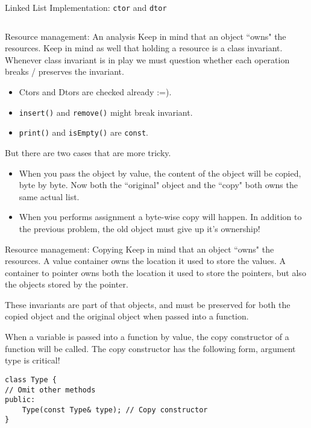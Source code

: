 \begin{frame}[fragile]{Linked List Implementation: \texttt{ctor} and \texttt{dtor}}
\inputminted[firstline=4,lastline=15]{c++}{code/Linked-List/IntList.cpp}
\end{frame}

\begin{frame}[fragile]{Resource management: An analysis}
Keep in mind that an object ``owns" the resources. Keep in mind as well that holding a resource is a class invariant. Whenever class invariant is in play we must question whether each operation breaks / preserves the invariant. 

\begin{itemize}
	\item Ctors and Dtors are checked already :=).
	\item \texttt{insert()} and \texttt{remove()} might break invariant.
	\item \texttt{print()} and \texttt{isEmpty()} are \texttt{const}.
\end{itemize}

But there are two cases that are more tricky.
\begin{itemize}
	\item When you pass the object by value, the content of the object will be copied, byte by byte. Now both the ``original" object and the ``copy" both owns the same actual list.
	\item When you performs assignment a byte-wise copy will happen. In addition to the previous problem, the old object must give up it's ownership!
\end{itemize}
\end{frame}




\begin{frame}[fragile]{Resource management: Copying}
Keep in mind that an object ``owns" the resources. \alert{A value container owns the location it used to store the values. A container to pointer owns both the location it used to store the pointers, but also the objects stored by the pointer.} 

These invariants are part of that objects, and must be preserved for both the copied object and the original object when passed into a function. 

When a variable is passed into a function by value, the copy constructor of a function will be called. The copy constructor has the following form, \alert{argument type is critical}!

\begin{verbatim}
class Type {
// Omit other methods
public:
    Type(const Type& type); // Copy constructor
}
\end{verbatim}
\end{frame}

